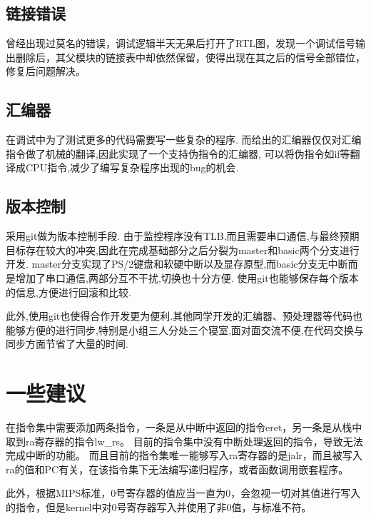   \subsection{链接错误}
    曾经出现过莫名的错误，调试逻辑半天无果后打开了RTL图，发现一个调试信号输出删除后，其父模块的链接表中却依然保留，使得出现在其之后的信号全部错位，修复后问题解决。
  \subsection{汇编器}
    在调试中为了测试更多的代码需要写一些复杂的程序.
    而给出的汇编器仅仅对汇编指令做了机械的翻译,因此实现了一个支持伪指令的汇编器,
    可以将伪指令如if等翻译成CPU指令,减少了编写复杂程序出现的bug的机会.
  \subsection{版本控制}
    采用git做为版本控制手段.
    由于监控程序没有TLB,而且需要串口通信,与最终预期目标存在较大的冲突,因此在完成基础部分之后分裂为master和basic两个分支进行开发.
    master分支实现了PS/2键盘和软硬中断以及显存原型,而basic分支无中断而是增加了串口通信,两部分互不干扰,切换也十分方便.
    使用git也能够保存每个版本的信息,方便进行回滚和比较.

    此外,使用git也使得合作开发更为便利.其他同学开发的汇编器、预处理器等代码也能够方便的进行同步,特别是小组三人分处三个寝室,面对面交流不便,在代码交换与同步方面节省了大量的时间.

\section{一些建议}
  在指令集中需要添加两条指令，一条是从中断中返回的指令eret，另一条是从栈中取到ra寄存器的指令lw_rs。
  目前的指令集中没有中断处理返回的指令，导致无法完成中断的功能。
  而且目前的指令集唯一能够写入ra寄存器的是jalr，而且被写入ra的值和PC有关，在该指令集下无法编写递归程序，或者函数调用嵌套程序。

  此外，根据MIPS标准，0号寄存器的值应当一直为0，会忽视一切对其值进行写入的指令，但是kernel中对0号寄存器写入并使用了非0值，与标准不符。


